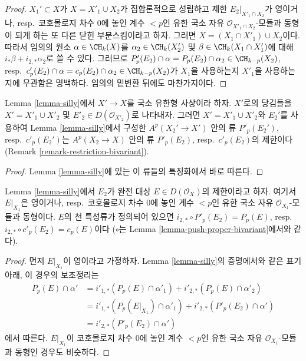 \begin{proof}
$X_1' \subset X$가 $X = X'_1 \cup X_2$가 집합론적으로 성립하고
제한 $E_2|_{X'_1 \cap X_2}$가 영이거나, resp.\ 코호몰로지 차수 $0$에
놓인 계수 $< p$인 유한 국소 자유 $\mathcal{O}_{X'_1 \cap X_2}$-모듈과
동형이 되게 하는 또 다른 닫힌 부분스킴이라고 하자. 그러면
$X = (X_1 \cap X'_1) \cup X_2$이다. 따라서 임의의 원소
$\alpha \in \CH_k(X)$를 $\alpha_2 \in \CH_k(X'_2)$ 및
$\beta \in \CH_k(X_1 \cap X'_1)$에 대해
$i_*\beta + i_{2, *}\alpha_2$로 쓸 수 있다. 그러므로
$P'_p(E_2) \cap \alpha = P_p(E_2) \cap \alpha_2 \in \CH_{k - p}(X_2)$,
resp.\  $c'_p(E_2) \cap \alpha = c_p(E_2) \cap \alpha_2 \in \CH_{k - p}(X_2)$가
$X_1$을 사용하는지 $X'_1$을 사용하는지에 무관함은 명백하다. 임의의
밑변환 뒤에도 마찬가지이다.
\end{proof}

\begin{lemma}
\label{lemma-base-change-silly}
Lemma \ref{lemma-silly}에서 $X' \to X$를 국소 유한형 사상이라 하자.
$X'$로의 당김들을 $X' = X'_1 \cup X'_2$ 및
$E'_2 \in D(\mathcal{O}_{X'_2})$로 나타내자. 그러면
$X' = X'_1 \cup X'_2$와 $E_2'$를 사용하여 Lemma \ref{lemma-silly}에서
구성한 $A^p(X_2' \to X')$ 안의 류 $P'_p(E_2')$, resp.\ $c'_p(E_2')$는
$A^p(X_2 \to X)$ 안의 류 $P'_p(E_2)$, resp.\ $c'_p(E_2)$의 제한이다
(Remark \ref{remark-restriction-bivariant}).
\end{lemma}

\begin{proof}
Lemma \ref{lemma-silly}에 있는 이 류들의 특징화에서 바로 따른다.
\end{proof}

\begin{lemma}
\label{lemma-silly-silly}
Lemma \ref{lemma-silly}에서 $E_2$가 완전 대상
$E \in D(\mathcal{O}_X)$의 제한이라고 하자. 여기서 $E|_{X_1}$은
영이거나, resp.\ 코호몰로지 차수 $0$에 놓인 계수 $< p$인 유한 국소
자유 $\mathcal{O}_{X_1}$-모듈과 동형이다. $E$의 천 특성류가 정의되어
있으면
$i_{2, *} \circ P'_p(E_2) = P_p(E)$,
resp.\ $i_{2, *} \circ c'_p(E_2) = c_p(E)$이다
($\circ$는 Lemma \ref{lemma-push-proper-bivariant}에서와 같다).
\end{lemma}

\begin{proof}
먼저 $E|_{X_1}$이 영이라고 가정하자. Lemma \ref{lemma-silly}의 증명에서와
같은 표기 아래, 이 경우의 보조정리는
\begin{align*}
P_p(E) \cap \alpha'
& =
i'_{1, *}(P_p(E) \cap \alpha'_1) +
i'_{2, *}(P_p(E) \cap \alpha'_2) \\
& =
i'_{1, *}(P_p(E|_{X_1}) \cap \alpha'_1) +
i'_{2, *}(P'_p(E_2) \cap \alpha') \\
& =
i'_{2, *}(P'_p(E_2) \cap \alpha')
\end{align*}
에서 따른다. $E|_{X_1}$이 코호몰로지 차수 $0$에 놓인 계수 $< p$인
유한 국소 자유 $\mathcal{O}_{X_1}$-모듈과 동형인 경우도 비슷하다.
\end{proof}

